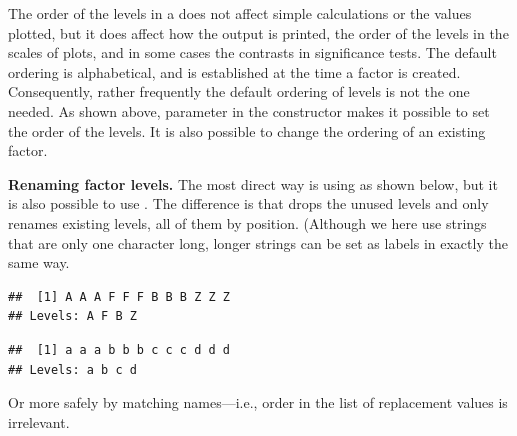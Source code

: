 \documentclass[krantz2]{krantz}\usepackage{knitr}
\begin{document}
The order of the levels in a  does not affect simple calculations or the values plotted, but it does affect how the output is printed, the order of the levels in the scales of plots, and in some cases the contrasts in significance tests. The default ordering is alphabetical, and is established at the time a factor is created. Consequently, rather frequently the default ordering of levels is not the one needed. As shown above, parameter  in the constructor makes it possible to set the order of the levels. It is also possible to change the ordering of an existing factor.

\begin{explainbox}
\textbf{Renaming factor levels.} The most direct way is using  as shown below, but it is also possible to use . The difference is that  drops the unused levels and  only renames existing levels, all of them by position. (Although we here use  strings that are only one character long, longer strings can be set as labels in exactly the same way.

\begin{knitrout}\footnotesize
{}\color{fgcolor}\begin{kframe}
\begin{alltt}
 \hlkwb{<-} \hlstd{(}\hlstd{,} \hlstd{,}  \hlstd{=} \hlstd{(}\hlstd{,} \hlstd{,} \hlstd{,} \hlstd{))}
\end{alltt}
\begin{verbatim}
##  [1] A A A F F F B B B Z Z Z
## Levels: A F B Z
\end{verbatim}
\begin{alltt}
 \hlkwb{<-} \hlstd{(}\hlstd{,} \hlstd{,} \hlstd{,} \hlstd{)}
\end{alltt}
\begin{verbatim}
##  [1] a a a b b b c c c d d d
## Levels: a b c d
\end{verbatim}
\end{kframe}
\end{knitrout}

Or more safely by matching names---i.e., order in the list of replacement values is irrelevant.


\end{explainbox}
\end{document}
